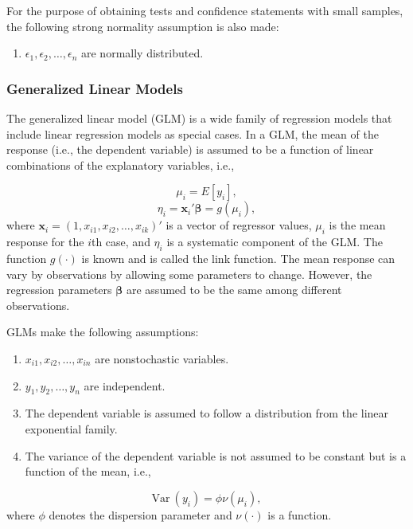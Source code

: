 \documentclass[]{book}
\providecommand{\tightlist}{%
  \setlength{\itemsep}{0pt}\setlength{\parskip}{0pt}}
\theoremstyle{definition}
\theoremstyle{definition}
\theoremstyle{definition}
\theoremstyle{remark}
\begin{document}
For the purpose of obtaining tests and confidence statements with small
samples, the following strong normality assumption is also made:

\begin{enumerate}
\def\labelenumi{(\alph{enumi})}
\setcounter{enumi}{3}
\tightlist
\item
  \(\epsilon_1,\epsilon_2,\ldots,\epsilon_n\) are normally distributed.
\end{enumerate}

\subsubsection{Generalized Linear
Models}\label{generalized-linear-models}

The generalized linear model (GLM) is a wide family of regression models
that include linear regression models as special cases. In a GLM, the
mean of the response (i.e., the dependent variable) is assumed to be a
function of linear combinations of the explanatory variables, i.e.,

\[\mu_i = E[y_i],\]
\[\eta_i = \textbf{x}_i'\boldsymbol{\beta} = g(\mu_i),\] where
\(\textbf{x}_i=(1,x_{i1}, x_{i2}, \ldots, x_{ik})'\) is a vector of
regressor values, \(\mu_i\) is the mean response for the \(i\)th case,
and \(\eta_i\) is a systematic component of the GLM. The function
\(g(\cdot)\) is known and is called the link function. The mean response
can vary by observations by allowing some parameters to change. However,
the regression parameters \(\boldsymbol{\beta}\) are assumed to be the
same among different observations.

GLMs make the following assumptions:

\begin{enumerate}
\def\labelenumi{(\alph{enumi})}
\item
  \(x_{i1},x_{i2},\ldots,x_{in}\) are nonstochastic variables.
\item
  \(y_1,y_2,\ldots,y_n\) are independent.
\item
  The dependent variable is assumed to follow a distribution from the
  linear exponential family.
\item
  The variance of the dependent variable is not assumed to be constant
  but is a function of the mean, i.e.,
\end{enumerate}

\[\mathrm{Var~}{(y_i)} = \phi \nu(\mu_i),\] where \(\phi\) denotes the
dispersion parameter and \(\nu(\cdot)\) is a function.
\end{document}
